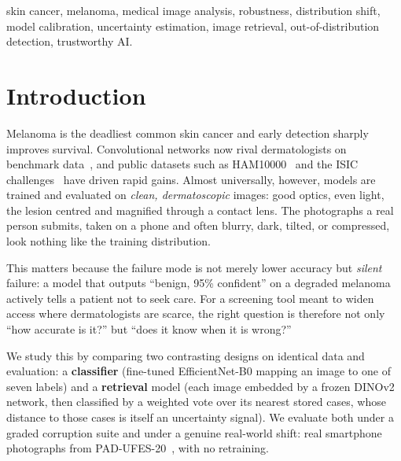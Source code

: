 \documentclass[conference]{IEEEtran}
\begin{document}
\begin{IEEEkeywords}
skin cancer, melanoma, medical image analysis, robustness, distribution shift,
model calibration, uncertainty estimation, image retrieval, out-of-distribution
detection, trustworthy AI.
\end{IEEEkeywords}

\section{Introduction}
Melanoma is the deadliest common skin cancer and early detection sharply
improves survival. Convolutional networks now rival dermatologists on benchmark
data~\cite{esteva2017}, and public datasets such as HAM10000~\cite{tschandl2018}
and the ISIC challenges~\cite{codella2018} have driven rapid gains. Almost
universally, however, models are trained and evaluated on \emph{clean,
dermatoscopic} images: good optics, even light, the lesion centred and
magnified through a contact lens. The photographs a real person submits, taken
on a phone and often blurry, dark, tilted, or compressed, look nothing like the
training distribution.

This matters because the failure mode is not merely lower accuracy but
\emph{silent} failure: a model that outputs ``benign, 95\% confident'' on a
degraded melanoma actively tells a patient not to seek care. For a screening
tool meant to widen access where dermatologists are scarce, the right question
is therefore not only ``how accurate is it?'' but ``does it know when it is
wrong?''

We study this by comparing two contrasting designs on identical data and
evaluation: a \textbf{classifier} (fine-tuned EfficientNet-B0 mapping an image
to one of seven labels) and a \textbf{retrieval} model (each image embedded by a
frozen DINOv2 network, then classified by a weighted vote over its nearest
stored cases, whose distance to those cases is itself an uncertainty signal). We
evaluate both under a graded corruption suite and under a genuine real-world
shift: real smartphone photographs from PAD-UFES-20~\cite{pacheco2020}, with no
retraining.
\end{document}
